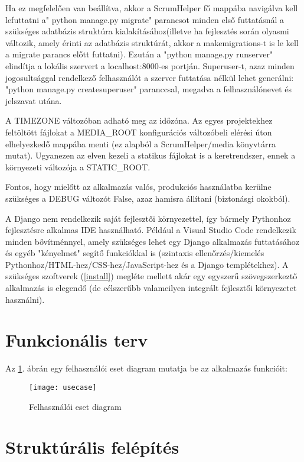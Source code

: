 Ha ez megfelelően van beállítva, akkor a ScrumHelper fő mappába navigálva kell lefuttatni a" python manage.py migrate" parancsot minden első futtatásnál a szükséges adatbázis struktúra kialakításához(illetve ha fejlesztés során olyasmi változik, amely érinti az adatbázis struktúrát, akkor a makemigrations-t is le kell a migrate parancs előtt futtatni). Ezután a "python manage.py runserver" elindítja a lokális szervert a localhost:8000-es portján. Superuser-t, azaz minden jogosultsággal rendelkező felhasználót a szerver futtatása nélkül lehet generálni: "python manage.py createsuperuser" paranccsal, megadva a felhasználónevet és jelszavat utána.

A TIMEZONE változóban adható meg az időzóna. Az egyes projektekhez feltöltött fájlokat a MEDIA\_ROOT konfigurációs változóbeli elérési úton elhelyezkedő mappába menti (ez alapból a ScrumHelper/media könyvtárra mutat). Ugyanezen az elven kezeli a statikus fájlokat is a keretrendszer, ennek a környezeti változója a STATIC\_ROOT.

Fontos, hogy mielőtt az alkalmazás valós, produkciós használatba kerülne szükséges a DEBUG változót False, azaz hamisra állítani (biztonásgi okokból).

A Django nem rendelkezik saját fejlesztői környezettel, így bármely Pythonhoz fejlesztésre alkalmas IDE használható. Például a Visual Studio Code rendelkezik minden bővítménnyel, amely szükséges lehet egy Django alkalmazás futtatásához és egyéb "kényelmet" segítő funkciókkal is (szintaxis ellenőrzés/kiemelés Pythonhoz/HTML-hez/CSS-hez/JavaScript-hez és a Django templétekhez). A szükséges szoftverek (\ref{install}) megléte mellett akár egy egyszerű szövegszerkeztő alkalmazás is elegendő (de célszerűbb valameilyen integrált fejlesztői környezetet használni).

\section{Funkcionális terv}

Az \ref{fig:usecase}. ábrán egy felhasználói eset diagram mutatja be az alkalmazás funkcióit:

\begin{figure}[H]
	\centering
	\texttt{[image: usecase]}
	\caption{Felhasználói eset diagram}
	\label{fig:usecase}
\end{figure}

\section{Struktúrális felépítés}

